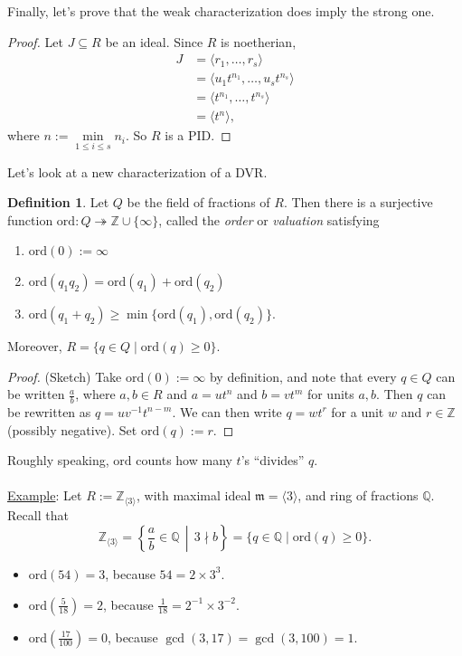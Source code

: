 \documentclass[12pt]{article}
\newcommand{\z}{\mathbb{Z}}
\newcommand{\q}{\mathbb{Q}}
\newcommand{\ita}[1]{\textit{#1}}
\newcommand{\vbrack}[1]{\langle #1\rangle}
\theoremstyle{definition}
\newtheorem{definition}[theorem]{Definition}
\begin{document}
Finally, let's prove that the weak characterization does imply the strong one.
\begin{proof}
    Let $J\subseteq R$ be an ideal. Since $R$ is noetherian,
    \begin{align*}
        J&=\vbrack{r_1,\dotsc,r_s}\\
        &=\vbrack{u_1t^{n_1},\dotsc,u_st^{n_s}}\\
        &=\vbrack{t^{n_1},\dotsc,t^{n_s}}\\
        &=\vbrack{t^n},
    \end{align*}
    where $n:=\min\limits_{1\leq i\leq s}n_i$. So $R$ is a PID.
\end{proof}
Let's look at a new characterization of a DVR.
\begin{definition}
    Let $Q$ be the field of fractions of $R$. Then there is a surjective function $\mathrm{ord}:Q\twoheadrightarrow\z\cup\{\infty\}$, called the \ita{order} or \ita{valuation} satisfying
    \begin{enumerate}
        \item $\mathrm{ord}(0):=\infty$
        \item $\mathrm{ord}(q_1q_2)=\mathrm{ord}(q_1)+\mathrm{ord}(q_2)$
        \item $\mathrm{ord}(q_1+q_2)\geq\min\{\mathrm{ord}(q_1),\mathrm{ord}(q_2)\}$.
    \end{enumerate}
    Moreover, $R=\{q\in Q\mid\mathrm{ord}(q)\geq0\}$.
\end{definition}
\begin{proof}
    (Sketch) Take $\mathrm{ord}(0):=\infty$ by definition, and note that every $q\in Q$ can be written $\frac{a}{b}$, where $a,b\in R$ and $a=ut^n$ and $b=vt^m$ for units $a,b$. Then $q$ can be rewritten as $q=uv^{-1}t^{n-m}$. We can then write $q=wt^r$ for a unit $w$ and $r\in\z$ (possibly negative). Set $\mathrm{ord}(q):=r$.
\end{proof}
Roughly speaking, $\mathrm{ord}$ counts how many $t$'s ``divides'' $q$.\\\\
\underline{Example}: Let $R:=\z_{\vbrack{3}}$, with maximal ideal $\mathfrak{m}=\vbrack{3}$, and ring of fractions $\q$. Recall that 
\[\z_{\vbrack{3}}=\left\{\frac{a}{b}\in\q\,\middle|\,3\nmid b\right\}=\{q\in\q\mid\mathrm{ord}(q)\geq0\}.\]
\begin{itemize}
    \item $\mathrm{ord}(54)=3$, because $54=2\times 3^3$.
    \item $\mathrm{ord}\left(\frac{5}{18}\right)=2$, because $\frac{1}{18}=2^{-1}\times3^{-2}$.
    \item $\mathrm{ord}\left(\frac{17}{100}\right)=0$, because $\gcd(3,17)=\gcd(3,100)=1$.
\end{itemize}
\end{document}
